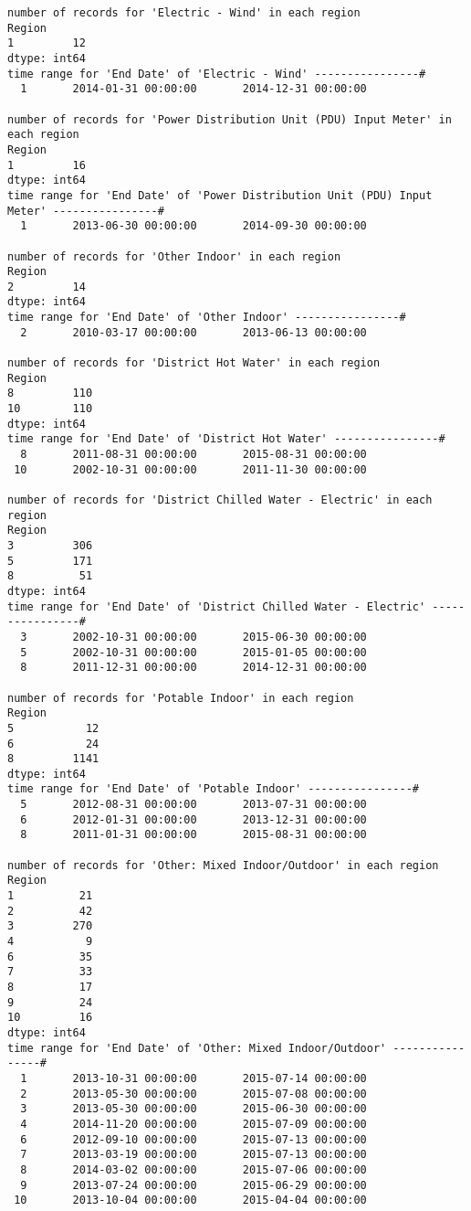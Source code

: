 \documentclass[12pt]{article}
\begin{document}
\begin{verbatim}
number of records for 'Electric - Wind' in each region
Region
1         12
dtype: int64
time range for 'End Date' of 'Electric - Wind' ----------------#
  1       2014-01-31 00:00:00       2014-12-31 00:00:00

number of records for 'Power Distribution Unit (PDU) Input Meter' in each region
Region
1         16
dtype: int64
time range for 'End Date' of 'Power Distribution Unit (PDU) Input Meter' ----------------#
  1       2013-06-30 00:00:00       2014-09-30 00:00:00

number of records for 'Other Indoor' in each region
Region
2         14
dtype: int64
time range for 'End Date' of 'Other Indoor' ----------------#
  2       2010-03-17 00:00:00       2013-06-13 00:00:00

number of records for 'District Hot Water' in each region
Region
8         110
10        110
dtype: int64
time range for 'End Date' of 'District Hot Water' ----------------#
  8       2011-08-31 00:00:00       2015-08-31 00:00:00
 10       2002-10-31 00:00:00       2011-11-30 00:00:00

number of records for 'District Chilled Water - Electric' in each region
Region
3         306
5         171
8          51
dtype: int64
time range for 'End Date' of 'District Chilled Water - Electric' ----------------#
  3       2002-10-31 00:00:00       2015-06-30 00:00:00
  5       2002-10-31 00:00:00       2015-01-05 00:00:00
  8       2011-12-31 00:00:00       2014-12-31 00:00:00

number of records for 'Potable Indoor' in each region
Region
5           12
6           24
8         1141
dtype: int64
time range for 'End Date' of 'Potable Indoor' ----------------#
  5       2012-08-31 00:00:00       2013-07-31 00:00:00
  6       2012-01-31 00:00:00       2013-12-31 00:00:00
  8       2011-01-31 00:00:00       2015-08-31 00:00:00

number of records for 'Other: Mixed Indoor/Outdoor' in each region
Region
1          21
2          42
3         270
4           9
6          35
7          33
8          17
9          24
10         16
dtype: int64
time range for 'End Date' of 'Other: Mixed Indoor/Outdoor' ----------------#
  1       2013-10-31 00:00:00       2015-07-14 00:00:00
  2       2013-05-30 00:00:00       2015-07-08 00:00:00
  3       2013-05-30 00:00:00       2015-06-30 00:00:00
  4       2014-11-20 00:00:00       2015-07-09 00:00:00
  6       2012-09-10 00:00:00       2015-07-13 00:00:00
  7       2013-03-19 00:00:00       2015-07-13 00:00:00
  8       2014-03-02 00:00:00       2015-07-06 00:00:00
  9       2013-07-24 00:00:00       2015-06-29 00:00:00
 10       2013-10-04 00:00:00       2015-04-04 00:00:00


\end{verbatim}
\end{document}
